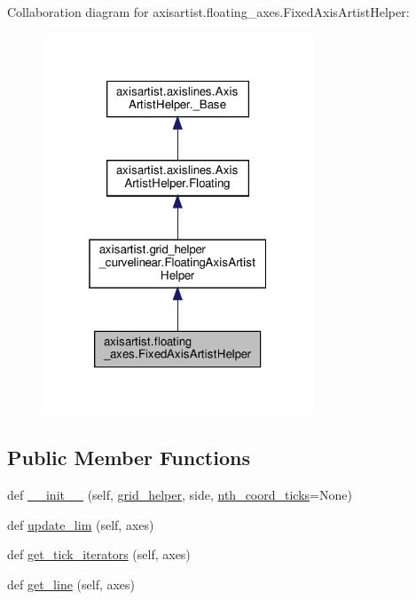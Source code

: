 Collaboration diagram for axisartist.\+floating\+\_\+axes.\+Fixed\+Axis\+Artist\+Helper\+:
\nopagebreak
\begin{figure}[H]
\begin{center}
\leavevmode
\includegraphics[width=229pt]{classaxisartist_1_1floating__axes_1_1FixedAxisArtistHelper__coll__graph}
\end{center}
\end{figure}
\subsection*{Public Member Functions}
\begin{DoxyCompactItemize}
\item 
def \hyperlink{classaxisartist_1_1floating__axes_1_1FixedAxisArtistHelper_af9139dd0ba4c9dcf9e976388f983574a}{\+\_\+\+\_\+init\+\_\+\+\_\+} (self, \hyperlink{classaxisartist_1_1floating__axes_1_1FixedAxisArtistHelper_afd8544d21a58281815be582f0923fe4c}{grid\+\_\+helper}, side, \hyperlink{classaxisartist_1_1floating__axes_1_1FixedAxisArtistHelper_ae39bd32ff5e59deb0ff93c46c57c5e21}{nth\+\_\+coord\+\_\+ticks}=None)
\item 
def \hyperlink{classaxisartist_1_1floating__axes_1_1FixedAxisArtistHelper_adac17fb68177bd0fff3d848e54391798}{update\+\_\+lim} (self, axes)
\item 
def \hyperlink{classaxisartist_1_1floating__axes_1_1FixedAxisArtistHelper_a10b5e38341df952378b32cc53ff323c1}{get\+\_\+tick\+\_\+iterators} (self, axes)
\item 
def \hyperlink{classaxisartist_1_1floating__axes_1_1FixedAxisArtistHelper_a4a2d47835fc0d025c9c3c963ae9c80ec}{get\+\_\+line} (self, axes)
\end{DoxyCompactItemize}
